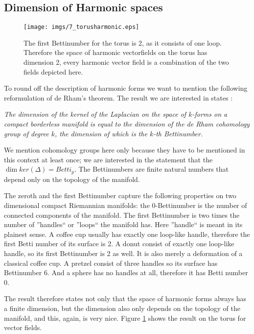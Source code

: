 

\subsection{Dimension of Harmonic spaces }
\begin{figure}%
\begin{center}
\texttt{[image: imgs/7\_torusharmonic.eps]}%
\end{center}
\caption{The first Bettinumber for the torus is 2, as it consists of one loop. Therefore the space of harmonic vectorfields on the torus has dimension 2, every harmonic vector field is a combination of the two fields depicted here.}%
\label{fig:vftorusharmonic}%
\end{figure}

To round off the description of harmonic forms we want to mention the following reformulation of de Rham's theorem.
The result we are interested in states : 
\vspace{0.5cm}

\emph{The dimension of the kernel of the Laplacian on the space of $k$-forms on a compact borderless manifold is equal to the dimension of the de Rham cohomology group of degree $k$, the dimension of which is the $k$-th Bettinumber.} 

\vspace{0.5cm}
We mention cohomology groups here only because they have to be mentioned in this context at least once; we are interested in the statement that the $\dim ker(\Delta) = Betti_p$. The Bettinumbers are finite natural numbers that depend only on the topology of the manifold. 

The zeroth and the first Bettinumber capture the following properties on two dimensional compact Riemannian manifolds: the 0-Bettinumber is the number of connected components of the manifold. The first Bettinumber is two times the number of ''handles`` or ''loops`` the manifold has. Here ''handle`` is meant in its plainest sense. A coffee cup usually has exactly one loop-like handle, therefore the first Betti number of its surface is 2. A donut consist of exactly one loop-like handle, so its first Bettinumber is 2 as well. It is also merely a deformation of a classical coffee cup. A pretzel consist of three handles so its surface has Bettinumber 6. And a sphere has no handles at all, therefore it has Betti number 0.

The result therefore states not only that the space of harmonic forms always has a finite dimension, but the dimension also only depends on the topology of the manifold, and this, again, is very nice. Figure \ref{fig:vftorusharmonic} shows the result on the torus for vector fields.

